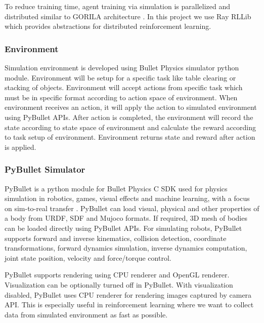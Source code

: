 To reduce training time, agent training via simulation is parallelized and distributed similar to GORILA architecture \cite{gorila}. In this project we use Ray RLLib \cite{rllib} which provides abstractions for distributed reinforcement learning.

\subsubsection{Environment}
Simulation environment is developed using Bullet Physics simulator python module. Environment will be setup for a specific task like table clearing or stacking of objects. Environment will accept actions from specific task which must be in specific format according to action space of environment. When environment receives an action, it will apply the action to simulated environment using PyBullet APIs. After action is completed, the environment will record the state according to state space of environment and calculate the reward according to task setup of environment. Environment returns state and reward after action is applied.

\subsubsection{PyBullet Simulator}
PyBullet is a python module for Bullet Physics C SDK used for physics simulation in robotics, games, visual effects and machine learning, with a focus on sim-to-real transfer \cite{pybullet}. PyBullet can load visual, physical and other properties of a body from URDF, SDF and Mujoco formats. If required, 3D mesh of bodies can be loaded directly using PyBullet APIs. For simulating robots, PyBullet supports forward and inverse kinematics, collision detection, coordinate transformations, forward dynamics simulation, inverse dynamics computation, joint state position, velocity and force/torque control.

PyBullet supports rendering using CPU renderer and OpenGL renderer. Visualization can be optionally turned off in PyBullet. With visualization disabled, PyBullet uses CPU renderer for rendering images captured by camera API. This is especially useful in reinforcement learning where we want to collect data from simulated environment as fast as possible.

